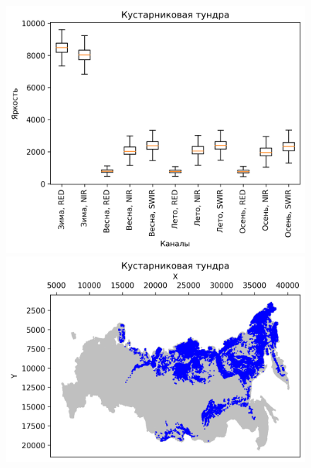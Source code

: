 \documentclass[14pt, a4paper, oneside]{extarticle}
\begin{document}
\begin{figure}[H]
    \centering
    \includegraphics[]{class-16-boxplot}
    \includegraphics[]{class-16-map}
\end{figure}
\end{document}
